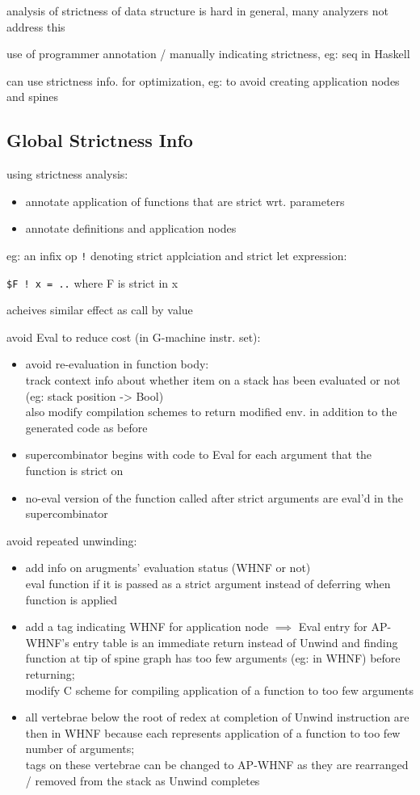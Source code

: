 \documentclass[8pt]{extarticle}
\begin{document}
\begin{multicols*}{2}
analysis of strictness of data structure is hard in general, many analyzers not address this

use of programmer annotation / manually indicating strictness, eg: seq in Haskell

can use strictness info. for optimization, eg: to avoid creating application nodes and spines

\subsection{Global Strictness Info}

using strictness analysis:
\begin{itemize}
\item annotate application of functions that are strict wrt. parameters
\item annotate definitions and application nodes
\end{itemize}

eg: an infix op \verb|!| denoting strict applciation and strict let expression:

\verb|$F ! x = ..| where F is strict in x

acheives similar effect as call by value

avoid Eval to reduce cost (in G-machine instr. set):
\begin{itemize}
\item avoid re-evaluation in function body:\\
  track context info about whether item on a stack has been evaluated or not (eg: stack position -> Bool)\\
  also modify compilation schemes to return modified env. in addition to the generated code as before
\item supercombinator begins with code to Eval for each argument that the function is strict on
\item no-eval version of the function called after strict arguments are eval'd in the supercombinator 
\end{itemize}

avoid repeated unwinding:
\begin{itemize}
\item add info on arugments' evaluation status (WHNF or not)\\
  eval function if it is passed as a strict argument instead of deferring when function is applied
\item add a tag indicating WHNF for application node $\implies$ Eval entry for AP-WHNF's entry table is an immediate return instead of Unwind and finding function at tip of spine graph has too few arguments (eg: in WHNF) before returning;\\
  modify C scheme for compiling application of a function to too few arguments
\item all vertebrae below the root of redex at completion of Unwind instruction are then in WHNF because each represents application of a function to too few number of arguments;\\
  tags on these vertebrae can be changed to AP-WHNF as they are rearranged / removed from the stack as Unwind completes
\end{itemize}


\end{multicols*}
\end{document}
